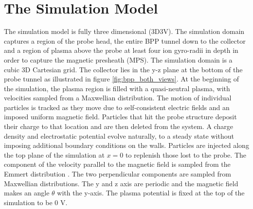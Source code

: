 \section{The Simulation Model} \label{section:model}
The simulation model is fully three dimensional (3D3V). The simulation domain captures a region of the probe head, the entire BPP tunnel down to the collector and a region of plasma above the probe at least four ion gyro-radii in depth in order to capture the magnetic presheath (MPS). The simulation domain is a cubic 3D Cartesian grid. The collector lies in the y-z plane at the bottom of the probe tunnel as illustrated in figure \ref{fig:bpp_both_views}.  At the beginning of the simulation, the plasma region is filled with a quasi-neutral plasma, with velocities sampled from a Maxwellian distribution. The motion of individual particles is tracked as they move due to self-consistent electric fields and an imposed uniform magnetic field. Particles that hit the probe structure deposit their charge to that location and are then deleted from the system. A charge density and electrostatic potential evolve naturally, to a steady state without imposing additional boundary conditions on the walls.  Particles are injected along the top plane of the simulation at $x=0$ to replenish those lost to the probe. The component of the velocity parallel to the magnetic field is sampled from the Emmert distribution \cite{Emmert}. The two perpendicular components are sampled from Maxwellian distributions.  The y and z axis are periodic and the magnetic field makes an angle $\theta$ with the y-axis. The plasma potential is fixed at the top of the simulation to be 0 V. 

